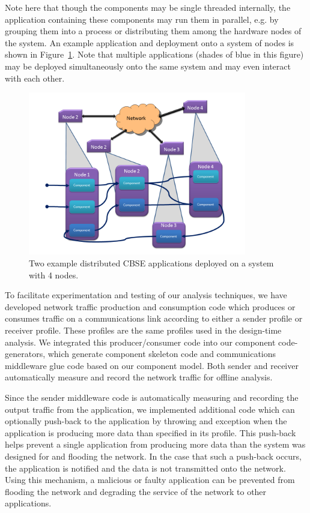 Note here that though the components may be single threaded
internally, the application containing these components may run them
in parallel, e.g. by grouping them into a process or distributing them
among the hardware nodes of the system.  An example application and
deployment onto a system of nodes is shown in Figure~\ref{fig:cbse}.
Note that multiple applications (shades of blue in this figure) may be
deployed simultaneously onto the same system and may even interact
with each other.

\begin{figure}[ht!]
  \centering
  \includegraphics[width=0.85\textwidth]{../doc/src/images/results/cbse.png}
  \caption{Two example distributed CBSE applications deployed on a system with
    4 nodes.}
  \label{fig:cbse}
\end{figure}
   
To facilitate experimentation and testing of our analysis techniques,
we have developed network traffic production and consumption code
which produces or consumes traffic on a communications link according
to either a sender profile or receiver profile.  These profiles are
the same profiles used in the design-time analysis.  We integrated
this producer/consumer code into our component code-generators, which
generate component skeleton code and communications middleware glue
code based on our component model.  Both sender and receiver
automatically measure and record the network traffic for offline
analysis.

Since the sender middleware code is automatically measuring and
recording the output traffic from the application, we implemented
additional code which can optionally push-back to the application by
throwing and exception when the application is producing more data
than specified in its profile.  This push-back helps prevent a single
application from producing more data than the system was designed for
and flooding the network.  In the case that such a push-back occurs,
the application is notified and the data is not transmitted onto the
network.  Using this mechanism, a malicious or faulty application can
be prevented from flooding the network and degrading the service of
the network to other applications.

